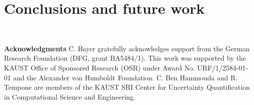\documentclass[11pt]{article}
\begin{document}
\section{Conclusions and future work}



\

\textbf{Acknowledgments} C. Bayer gratefully acknowledges support from the German Research Foundation (DFG, grant BA5484/1). This work was supported by the KAUST Office of Sponsored Research (OSR) under Award No. URF/1/2584-01-01 and the Alexander von Humboldt Foundation. C. Ben Hammouda and R. Tempone are members of the KAUST SRI Center for Uncertainty Quantification in Computational Science and Engineering. 





 




%






 

 

 
 
 
\end{document}
